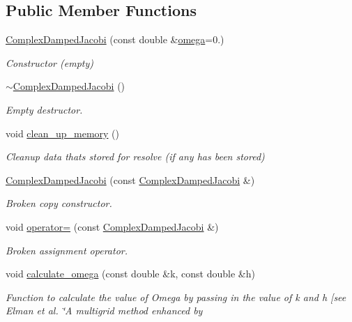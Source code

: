 \subsection*{Public Member Functions}
\begin{DoxyCompactItemize}
\item 
\hyperlink{classoomph_1_1ComplexDampedJacobi_a5c76dd5e5fac0246eced85a66df6c7ee}{Complex\+Damped\+Jacobi} (const double \&\hyperlink{classoomph_1_1ComplexDampedJacobi_a7132c319d14c6d3c6aac8ac0536af801}{omega}=0.)
\begin{DoxyCompactList}\small\item\em Constructor (empty) \end{DoxyCompactList}\item 
\hyperlink{classoomph_1_1ComplexDampedJacobi_a102defdc208413f82a6cd377bf5e0517}{$\sim$\+Complex\+Damped\+Jacobi} ()
\begin{DoxyCompactList}\small\item\em Empty destructor. \end{DoxyCompactList}\item 
void \hyperlink{classoomph_1_1ComplexDampedJacobi_a4e246d712c8eb9e4db05f859148784d3}{clean\+\_\+up\+\_\+memory} ()
\begin{DoxyCompactList}\small\item\em Cleanup data that\textquotesingle{}s stored for resolve (if any has been stored) \end{DoxyCompactList}\item 
\hyperlink{classoomph_1_1ComplexDampedJacobi_a290c1a7f550d0abff01d6bfd69c2fbe0}{Complex\+Damped\+Jacobi} (const \hyperlink{classoomph_1_1ComplexDampedJacobi}{Complex\+Damped\+Jacobi} \&)
\begin{DoxyCompactList}\small\item\em Broken copy constructor. \end{DoxyCompactList}\item 
void \hyperlink{classoomph_1_1ComplexDampedJacobi_abff6e2acd7cf7b7bb3a82612f9404460}{operator=} (const \hyperlink{classoomph_1_1ComplexDampedJacobi}{Complex\+Damped\+Jacobi} \&)
\begin{DoxyCompactList}\small\item\em Broken assignment operator. \end{DoxyCompactList}\item 
void \hyperlink{classoomph_1_1ComplexDampedJacobi_af7a53121690e157bdd5bc191a31f9892}{calculate\+\_\+omega} (const double \&k, const double \&h)
\begin{DoxyCompactList}\small\item\em Function to calculate the value of Omega by passing in the value of k and h \mbox{[}see Elman et al. \char`\"{}\+A multigrid method enhanced by

\end{DoxyCompactList}
\end{DoxyCompactItemize}
